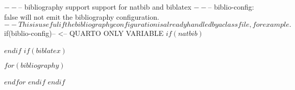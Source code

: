 $--
$-- bibliography support support for natbib and biblatex
$--

$-- biblio-config: false will not emit the bibliography configuration. 
$-- This is useful if the bibliography configuration is already handled by a class file, for example.
$if(biblio-config)$ $-- <-- QUARTO ONLY VARIABLE
$if(natbib)$
\usepackage[$natbiboptions$]{natbib}

$endif$
$if(biblatex)$
\usepackage[$if(biblio-style)$style=$biblio-style$,$endif$$for(biblatexoptions)$$biblatexoptions$$sep$,$endfor$]{biblatex}
$for(bibliography)$

$endfor$
$endif$
$endif$
